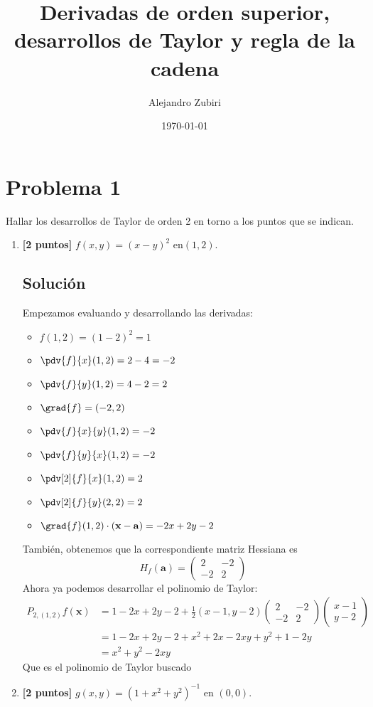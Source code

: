 \documentclass[12pt,a4paper,reqno]{article}
\title{Derivadas de orden superior, desarrollos de Taylor y regla de la cadena}
\date{\today}
\author{Alejandro Zubiri}
\begin{document}
	\maketitle
	\section{Problema 1}
	Hallar los desarrollos de Taylor de orden 2 en torno a los puntos que se indican.
	\begin{enumerate}[label={(\alph*)}]
		\item \textbf{[2 puntos]} $f(x,y)=(x-y)^2$ en$(1,2)$.
		
		\subsection*{Solución}
		Empezamos evaluando y desarrollando las derivadas:
		\begin{itemize}
			\item $f(1,2)=(1-2) ^{2}=1$
			\item $\pdv{f}{x}(1,2)=2-4=-2$
			\item $\pdv{f}{y}(1,2)=4-2=2$
			\item $\grad{f}=(-2,2)$ 
			\item $\pdv{f}{x}{y}(1,2)=-2$ 
			\item $\pdv{f}{y}{x}(1,2)=-2$
			\item $\pdv[2]{f}{x}(1,2)=2$
			\item $\pdv[2]{f}{y}(2,2)=2$ 
			\item $\grad{f}(1,2)\cdot (\mathbf{x}-\mathbf{a})=-2x+2y-2$ 
		\end{itemize}
	También, obtenemos que la correspondiente matriz Hessiana es
	\[
	H_{f}(\mathbf{a})= \begin{pmatrix}
		2 & -2 \\ -2 & 2
	\end{pmatrix}
	\]
	Ahora ya podemos desarrollar el polinomio de Taylor:
	\begin{equation}
		\begin{split}
			P_{2,(1,2)}f(\mathbf{x})&=1-2x+2y-2+ \frac{1}{2}(x-1,y-2) \begin{pmatrix}
				2 & -2 \\ -2 & 2	
			\end{pmatrix} \begin{pmatrix}
				x-1 \\ y -2
			\end{pmatrix}\\
			&=1 -2x +2y -2 +x^{2}+2x-2xy+y^{2}+1-2y\\
			&=x ^{2}+y ^{2} -2xy
		\end{split}
	\end{equation}
	Que es el polinomio de Taylor buscado		
\item \textbf{[2 puntos]} $g(x,y)=(1+x^2+y^2)^{-1}$ en $(0,0)$.
		

\end{enumerate}
\end{document}

